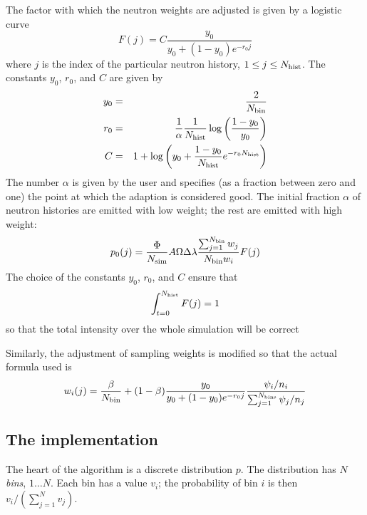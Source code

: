 The factor with which the neutron weights are adjusted is given by a
logistic curve
\begin{equation}
  F(j) = C\frac{y_0}{y_0 + (1 - y_0) e^{-r_0 j}}
\end{equation}
where $j$ is the index of the particular neutron history, $1 \leq j
\leq N_{\rm hist}$. The constants $y_0$, $r_0$, and $C$ are given by
\begin{eqnarray}
  y_0 &=& \frac{2}{N_{\rm bin}} \\
  r_0 &=& \frac{1}{\alpha}\frac{1}{N_{\rm hist}}
     \log\left(\frac{1 - y_0}{y_0}\right) \\
  C &=& 1 + \log\left(y_0 + \frac{1 - y_0}{N_{\rm hist}}
     e^{-r_0 N_{\rm hist}}\right)
\end{eqnarray}
The number $\alpha$ is given by the user and specifies (as a fraction
between zero and one) the point at which the adaption is considered
good. The initial fraction $\alpha$ of neutron histories are emitted
with low weight; the rest are emitted with high weight:
\begin{equation} 
  p_0(j) =
    \frac{\Phi}{N_{\rm sim}} A \Omega \Delta\lambda
    \frac{\sum_{j=1}^{N_{\rm bin}} w_j}{N_{\rm bin} w_i}
    F(j)
\end{equation}
The choice of the constants $y_0$, $r_0$, and $C$ ensure that
\begin{equation}
\int_{t=0}^{N_{\rm hist}} F(j) = 1
\end{equation}
so that the total intensity over the whole simulation will be correct

Similarly, the adjustment of sampling weights is modified so that the
actual formula used is
\begin{equation}
w_i(j) = \frac{\beta}{N_{\rm bin}} +
    (1-\beta) \frac{y_0}{y_0 + (1 - y_0) e^{-r_0 j}}
     \frac{\psi_i/n_i}{\sum_{j=1}^{N_{\rm bins}} \psi_j/n_j}
\end{equation}

\subsection{The implementation}

The heart of the algorithm is a discrete distribution $p$. The
distribution has $N$ \emph{bins}, $1\ldots N$. Each bin has a value
$v_i$; the probability of bin $i$ is then $v_i/(\sum_{j=1}^N v_j)$.


